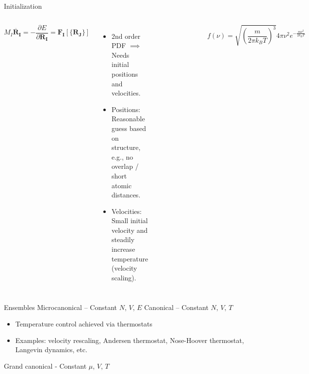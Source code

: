 \documentclass[aspectratio=169]{beamer}
\let \vec \mathbf
\begin{document}
\begin{frame}{Initialization}

\begin{columns}
\begin{equation*}
M_I \ddot{\vec{R_I}} = - \frac{\partial E}{\partial \vec{R_I}} = \vec{F_I}[\{\vec{R_J}\}]
\end{equation*} 
\begin{itemize}
    \item 2nd order PDF $\implies$ Needs initial positions and velocities.
    \item Positions: Reasonable guess based on structure, e.g., no overlap / short atomic distances.
    \item Velocities: Small initial velocity and steadily increase temperature (velocity scaling).
\end{itemize}

\begin{figure}
    \centering
    \includegraphics[width=0.8\linewidth]{lectures/figures/13-Maxwell_Boltzmann.png}
\end{figure} 
\begin{equation*}
f(\nu)=\sqrt{\left( \frac{m}{2\pi k_BT} \right)^3} 4\pi \nu^2 e^{-\frac{m\nu^2}{2k_BT}}
\end{equation*} 
\end{columns} 
\end{frame} 

\begin{frame}{Ensembles}
Microcanonical – Constant $N$, $V$, $E$\newline
\newline 
Canonical – Constant $N$, $V$, $T$
\begin{itemize}
    \item Temperature control achieved via thermostats
    \item Examples: velocity rescaling, Andersen thermostat, Nose-Hoover thermostat, Langevin dynamics, etc.
\end{itemize}

Grand canonical - Constant $\mu$, $V$, $T$

\end{frame} 
\end{document}
